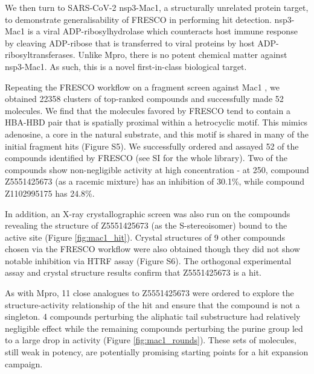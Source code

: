 We then turn to SARS-CoV-2 nsp3-Mac1, a structurally unrelated protein target, to demonstrate generalisability of FRESCO in performing hit detection. nsp3-Mac1 is a viral ADP-ribosylhydrolase which counteracts host immune response by cleaving ADP-ribose that is transferred to viral proteins by host ADP-ribosyltransferases. Unlike Mpro, there is no potent chemical matter against nsp3-Mac1. As such, this is a novel first-in-class biological target. 

Repeating the FRESCO workflow on a fragment screen against Mac1 \cite{Schuller2021Mac1Frag}, we obtained 22358 clusters of top-ranked compounds and successfully made 52 molecules. We find that the molecules favored by FRESCO tend to contain a HBA-HBD pair that is spatially proximal within a hetrocyclic motif. This mimics adenosine, a core in the natural substrate, and this motif is shared in many of the initial fragment hits (Figure S5). We successfully ordered and assayed 52 of the compounds identified by FRESCO (see SI for the whole library).  Two of the compounds show non-negligible activity at high concentration - at 250\uM, compound Z5551425673 (as a racemic mixture) has an inhibition of 30.1\%, while compound Z1102995175 has 24.8\%.

In addition, an X-ray crystallographic screen was also run on the compounds revealing the structure of Z5551425673 (as the S-stereoisomer) bound to the active site (Figure \ref{fig:mac1_hit}). Crystal structures of 9 other compounds chosen via the FRESCO workflow were also obtained though they did not show notable inhibition via HTRF assay (Figure S6). The orthogonal experimental assay and crystal structure results confirm that Z5551425673 is a hit. 

As with Mpro, 11 close analogues to Z5551425673 were ordered to explore the structure-activity relationship of the hit and ensure that the compound is not a singleton. 4 compounds perturbing the aliphatic tail substructure had relatively negligible effect while the remaining compounds perturbing the purine group led to a large drop in activity (Figure \ref{fig:mac1_rounds}). These sets of molecules, still weak in potency, are potentially promising starting points for a hit expansion campaign. 

